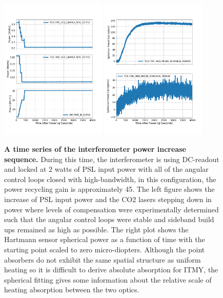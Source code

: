 	\begin{figure}[t!]
		\centering
		\includegraphics[width=0.45\textwidth]{../Figures/1231726400TCS_and_PSL_powerup.png}
		\includegraphics[width=0.45\textwidth]{../Figures/1231726400HWS_powerup.png}
		\caption[A time series of the interferometer power increase sequence.] 
		{\textbf{A time series of the interferometer power increase sequence.} 
			During this time, the interferometer is using DC-readout and locked at 2 watts of PSL input power with all of the angular control loops closed with high-bandwidth, in this configuration, the power recycling gain is approximately 45.  The left figure shows the increase of PSL input power and the CO2 lasers stepping down in power where levels of compensation were experimentally determined such that the angular control loops were stable and sideband build ups remained as high as possible.  The right plot shows the Hartmann sensor spherical power as a function of time with the starting point scaled to zero micro-diopters.  Although the point absorbers do not exhibit the same spatial structure as uniform heating so it is difficult to derive absolute absorption for ITMY, the spherical fitting gives some information about the relative scale of heating absorption between the two optics.}
		\label{fig:pwr_up_time}
	\end{figure}
	
